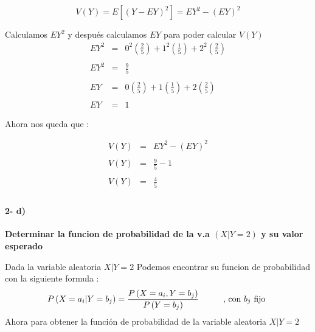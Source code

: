 \documentclass[12pt]{article}
\begin{document}
    \begin{equation*}
        V\left(Y\right) = E \left[\left(Y - EY\right)^2\right] = EY^2 - \left(EY\right)^2
    \end{equation*}

    Calculamos $EY^2$ y despu\'es calculamos $EY$ para poder calcular $V\left(Y\right)$
    \begin{equation*}
        \begin{array}{rcl}
            EY^2  & = & \displaystyle 0^2 \left(\frac{2}{5} \right)  + 1^2  \left(\frac{1}{5}\right) + 2^2 \left( \frac{2}{5}\right) 
            \\
            \\
            EY^2  & = & \displaystyle \frac{9}{5} 
            \\
            \\
            EY  & = & \displaystyle 0 \left(\frac{2}{5} \right)  + 1  \left(\frac{1}{5}\right) + 2 \left( \frac{2}{5}\right) 
            \\
            \\
            EY  & = & 1 
        \end{array}
    \end{equation*}

    Ahora nos queda que : 

    \begin{equation*}
        \begin{array}{rcl}
            V\left(Y\right) & = & EY^2 - \left(EY\right)^2 
            \\
            \\
            V\left(Y\right) & = & \displaystyle \frac{9}{5} - 1 
            \\
            \\
            V\left(Y\right) & = & \displaystyle \frac{4}{5}
            \\
        \end{array}
    \end{equation*}

    \paragraph*{2- d) }{\bf Determinar la funcion de probabilidad de la v.a $\left(X|Y = 2\right)$ y su valor esperado }
    
    \begin{flushleft}
        Dada la variable aleatoria $ X | Y = 2 $ Podemos encontrar su funcion de probabilidad con la siguiente formula : 
        \begin{equation*}
            P \left(X = a_i | Y = b_j\right) = \frac{P\left(X = a_i , Y = b_j\right)}{P \left(Y = b_j\right)}
            \hspace*{1cm} 
            \mbox{, con $b_j$  fijo } 
        \end{equation*}
        Ahora para obtener la funci\'on de probabilidad de la variable aleatoria $ X|Y =2$
    \end{flushleft}
\end{document}
